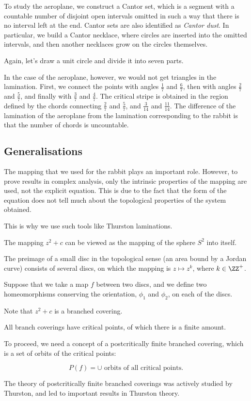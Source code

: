 \documentclass[11pt]{scrartcl}
\begin{document}
  To study the aeroplane, we construct a Cantor set, which is a
  segment with a countable number of disjoint open intervals omitted
  in such a way that there is no interval left at the end. Cantor sets
  are also identified as \textit{Cantor dust}. In particular, we build
  a Cantor necklace, where circles are inserted into the omitted
  intervals, and then another necklaces grow on the circles
  themselves.

  Again, let's draw a unit circle and divide it into seven parts.

  In the case of the aeroplane, however, we would not get triangles in
  the lamination. First, we connect the points with angles
  $\frac{1}{7}$ and $\frac{6}{7}$, then with angles $\frac{2}{7}$ and
  $\frac{5}{7}$, and finally with $\frac{3}{7}$ and $\frac{4}{7}$. The
  critical stripe is obtained in the region defined by the chords
  connecting $\frac{2}{7}$ and $\frac{5}{7}$, and $\frac{3}{14}$ and
  $\frac{11}{14}$. The difference of the lamination of the aeroplane
  from the lamination corresponding to the rabbit is that the number
  of chords is uncountable.

  \subsection{Generalisations}

  The mapping that we used for the rabbit plays an important role.
  However, to prove results in complex analysis, only the intrinsic
  properties of the mapping are used, not the explicit equation. This
  is due to the fact that the form of the equation does not tell much
  about the topological properties of the system obtained.

  This is why we use such tools like Thurston laminations.

  The mapping $z^{2} + c$ can be viewed as the mapping of the sphere
  $S^{2}$ into itself.

  The preimage of a small disc in the topological sense (an area bound
  by a Jordan curve) consists of several discs, on which the mapping
  is $z \mapsto z^{k}$, where $k \in \ZZ^{+} $.

  Suppose that we take a map $f$ between two discs, and we define two
  homeomorphisms conserving the orientation, $\phi_{1}$ and
  $\phi_{2}$, on each of the discs.

  Note that $z^{2} + c$ is a branched covering.

  All branch coverings have critical points, of which there is a
  finite amount.

  To proceed, we need a concept of a postcritically finite branched
  covering, which is a set of orbits of the critical points:
  
  \begin{equation*}
    P(f) = \cup \text{ orbits of all critical points}.
  \end{equation*}

  The theory of postcritically finite branched coverings was actively
  studied by Thurston, and led to important results in Thurston theory.
\end{document}

